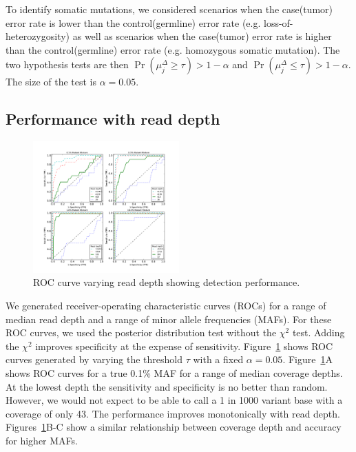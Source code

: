 \documentclass{bioinfo}
\begin{document}
To identify somatic mutations, we considered scenarios when the case(tumor) error rate is lower than the control(germline) error rate (e.g. loss-of-heterozygosity) as well as scenarios when the case(tumor) error rate is higher than the control(germline) error rate (e.g. homozygous somatic mutation). The two hypothesis tests are then $\Pr( \mu_j^{\Delta} \geq \tau ) > 1-\alpha$ and $\Pr( \mu_j^{\Delta} \leq \tau ) > 1-\alpha$. The size of the test is $\alpha=0.05$.


\subsection{Performance with read depth}\label{sec:read_depth}


\begin{figure}[htbp]
\begin{center}
\includegraphics[width=0.5\textwidth]{pdf_figs/ROC_without_chi2.pdf}
\caption{ROC curve varying read depth showing detection performance.}
\label{fig:ROC}
\end{center}
\end{figure}

We generated receiver-operating characteristic curves (ROCs) for a range of median read depth and a range of minor allele frequencies (MAFs). For these ROC curves, we used the posterior distribution test without the $\chi^2$ test. Adding the $\chi^2$ improves specificity at the expense of sensitivity. Figure~\ref{fig:ROC} shows ROC curves generated by varying the threshold $\tau$ with a fixed $\alpha=0.05$. Figure~\ref{fig:ROC}A shows ROC curves for a true 0.1\% MAF for a range of median coverage depths. At the lowest depth the sensitivity and specificity is no better than random. However, we would not expect to be able to call a 1 in 1000 variant base with a coverage of only 43. The performance improves monotonically with read depth. Figures~\ref{fig:ROC}B-C show a similar relationship between coverage depth and accuracy for higher MAFs.
\end{document}
